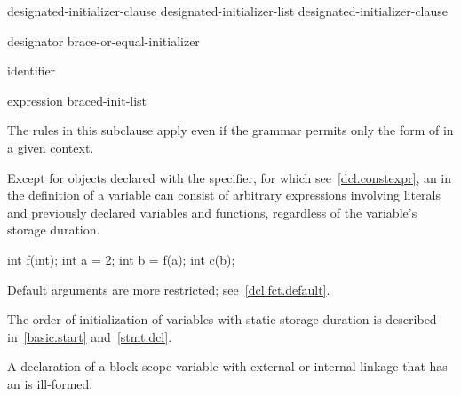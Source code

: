 \begin{bnf}
\br
    designated-initializer-clause\br
    designated-initializer-list \terminal{,} designated-initializer-clause
\end{bnf}

\begin{bnf}
\br
    designator brace-or-equal-initializer
\end{bnf}

\begin{bnf}
\br
     identifier
\end{bnf}

\begin{bnf}
\br
    expression\br
    braced-init-list
\end{bnf}

\begin{note}
The rules in this subclause apply even if the grammar permits only
the  form
of  in a given context.
\end{note}

\pnum
Except for objects declared with the  specifier, for which see~\ref{dcl.constexpr},
an  in the definition of a variable can consist of
arbitrary
%
%
expressions involving literals and previously declared
variables and functions,
regardless of the variable's storage duration.
\begin{example}
\begin{codeblock}
int f(int);
int a = 2;
int b = f(a);
int c(b);
\end{codeblock}
\end{example}

\pnum
\begin{note}
Default arguments are more restricted; see~\ref{dcl.fct.default}.
\end{note}

\pnum
\begin{note}
The order of initialization of variables with static storage duration is described in~\ref{basic.start}
and~\ref{stmt.dcl}.
\end{note}

\pnum
A declaration of a block-scope variable with external or internal
linkage that has an  is ill-formed.

